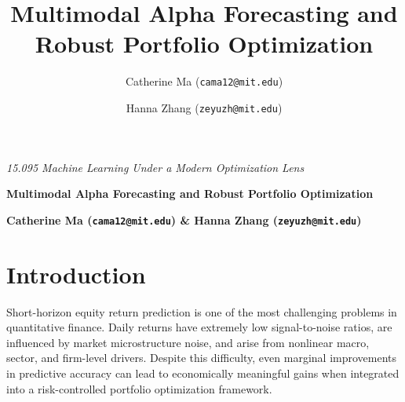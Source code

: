 \documentclass[11pt]{article}
\title{\vspace{-1.2cm} %
\bfseries\Large Multimodal Alpha Forecasting and Robust Portfolio Optimization}
\author[]{Catherine Ma (\texttt{cama12@mit.edu})}
\author[]{Hanna Zhang (\texttt{zeyuzh@mit.edu})}
\affil[]{}
\date{} %
\begin{document}



\begin{titlepage}
  \begin{center}
    \vspace*{\fill}

    {\huge \textit{15.095 Machine Learning Under a Modern Optimization Lens}}

    \vspace{0.5cm}

    {\huge \textbf{Multimodal Alpha Forecasting and Robust Portfolio Optimization}}

    \vspace{1.5cm}

    {\Large \textbf{Catherine Ma (\texttt{cama12@mit.edu}) \& Hanna Zhang (\texttt{zeyuzh@mit.edu})}}\\

    \vspace*{\fill}
  \end{center}
\end{titlepage}


\section{Introduction}
\noindent Short-horizon equity return prediction is one of the most challenging problems in quantitative finance. 
Daily returns have extremely low signal-to-noise ratios, are influenced by market microstructure noise, and arise from nonlinear macro, sector, and firm-level drivers.
Despite this difficulty, even marginal improvements in predictive accuracy can lead to economically meaningful gains when integrated into a risk-controlled portfolio optimization framework. \\
\end{document}
